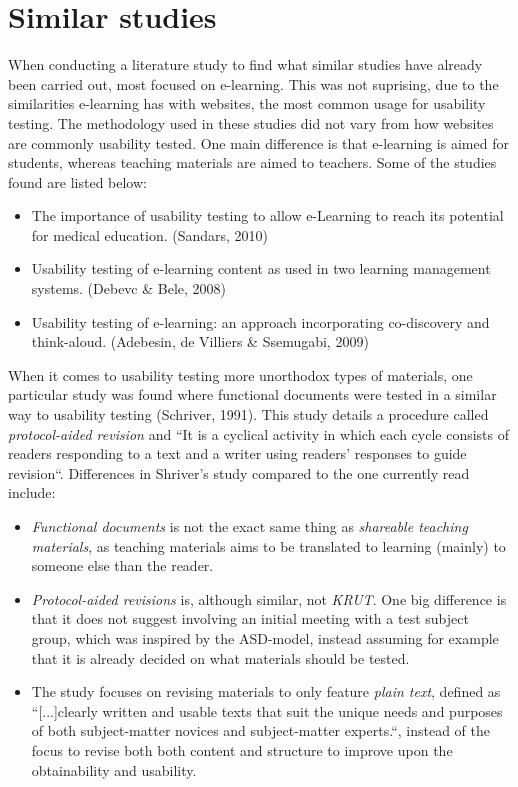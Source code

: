 \section{Similar studies}
When conducting a literature study to find what similar studies have already been carried out, most focused on e-learning. This was not suprising, due to the similarities e-learning has with websites, the most common usage for usability testing. The methodology used in these studies did not vary from how websites are commonly usability tested. One main difference is that e-learning is aimed for students, whereas teaching materials are aimed to teachers. Some of the studies found are listed below:
\begin{itemize}
\item The importance of usability testing to allow e-Learning to reach its potential for medical education. (Sandars, 2010)
\item Usability testing of e-learning content as used in two learning management systems. (Debevc \& Bele, 2008)
\item Usability testing of e-learning: an approach incorporating co-discovery and think-aloud. (Adebesin, de Villiers \& Ssemugabi, 2009)
\end{itemize}

When it comes to usability testing more unorthodox types of materials, one particular study was found where functional documents were tested in a similar way to usability testing (Schriver, 1991). This study details a procedure called \textit{protocol-aided revision} and “It is a cyclical activity in which each cycle consists of readers responding to a text and a writer using readers' responses to guide revision“. Differences in Shriver's study compared to the one currently read include:
\begin{itemize}
\item \textit{Functional documents} is not the exact same thing as \textit{shareable teaching materials}, as teaching materials aims to be translated to learning (mainly) to someone else than the reader.
\item \textit{Protocol-aided revisions} is, although similar, not \textit{KRUT}. One big difference is that it does not suggest involving an initial meeting with a test subject group, which was inspired by the ASD-model, instead assuming for example that it is already decided on what materials should be tested.
\item The study focuses on revising materials to only feature \textit{plain text}, defined as “[...]clearly written and usable texts that suit the unique needs and purposes of both subject-matter novices and subject-matter experts.“, instead of the focus to revise both both content and structure to improve upon the obtainability and usability.
\end{itemize}

